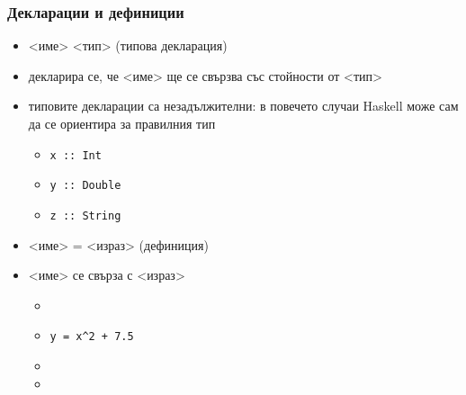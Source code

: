 \documentclass[alsotrans,beameroptions={aspectratio=169}]{beamerswitch}
\begin{document}
\begin{frame}
  \frametitle{Декларации и дефиниции}

  \begin{itemize}[<+->]
  \item {}<име> \tta{::} <тип> (типова декларация)
  \item декларира се, че <име> ще се свързва със стойности от <тип>
  \item \alert{типовите декларации са незадължителни: в повечето случаи Haskell може сам да се ориентира за правилния тип}
    \begin{itemize}[<.->]
    \item<+-> \tt{x :: Int}
    \item \tt{y :: Double}
    \item \tt{z :: String}
    \end{itemize}
  \item {}<име> \tta= <израз> (дефиниция)
  \item {}<име> се свърза с <израз>
    \begin{itemize}[<+->]
    \item {}
    \item \tt{y = x\^{}2 + 7.5}
    \item {}
    \item {}
    \end{itemize}
  \end{itemize}
\end{frame}
\end{document}
